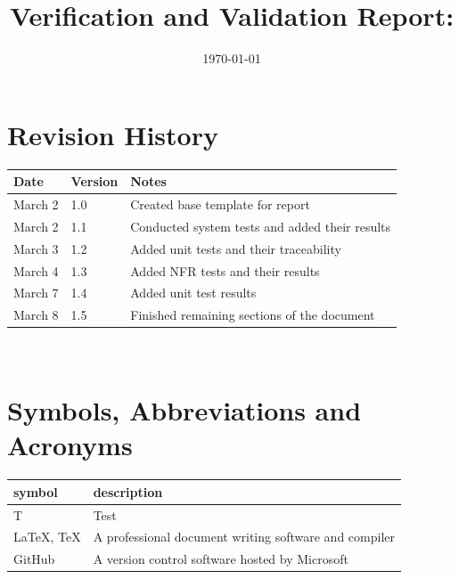 \documentclass[12pt, titlepage]{article}
\begin{document}
	
	\title{Verification and Validation Report: \progname} 
	\author{\authname}
	\date{\today}
	
	 \maketitle
	
	
	\section{Revision History}
	
	\begin{tabularx}{\textwidth}{p{3cm}p{2cm}X}
		\toprule {\bf Date} & {\bf Version} & {\bf Notes}\\
		\midrule
		March 2 & 1.0 & Created base template for report\\
		March 2 & 1.1 & Conducted system tests and added their results\\
		March 3 & 1.2 & Added unit tests and their traceability\\
		March 4 & 1.3 & Added NFR tests and their results \\
		March 7 & 1.4 & Added unit test results \\
		March 8 & 1.5 & Finished remaining sections of the document \\
		\bottomrule
	\end{tabularx}
	
	~\newpage
	
	\section{Symbols, Abbreviations and Acronyms}
	
	\renewcommand{\arraystretch}{1.2}
	\begin{tabular}{l l} 
		\toprule		
		\textbf{symbol} & \textbf{description}\\
		\midrule 
		T & Test\\
		LaTeX, TeX & A professional document writing software and compiler\\
		GitHub & A version control software hosted by Microsoft\\
		\bottomrule
	\end{tabular}\\
	
	
	\newpage
	
\end{document}
